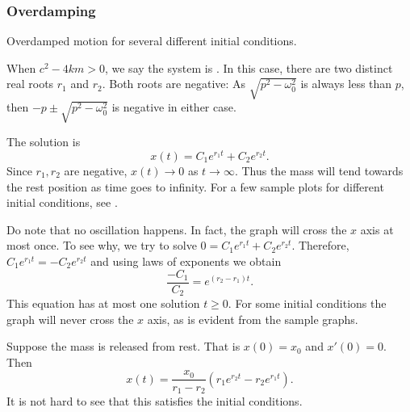 \subsubsection{Overdamping}

\begin{mywrapfig}{3.25in}
\capstart
{}
\caption{Overdamped motion for several different initial conditions.\label{mv:overdampedfig}}
\end{mywrapfig}
%
%

When
$c^2 - 4km > 0$, we say the system is \emph{}.  In this case,
there are two distinct real roots $r_1$ and $r_2$.  Both roots are
negative:  As $\sqrt{p^2 - \omega_0^2}$ is always less than $p$,
then
$-p \pm \sqrt{p^2 - \omega_0^2}$ is negative in either case.


The solution is
\begin{equation*}
x(t) = C_1 e^{r_1 t} + C_2 e^{r_2 t} .
\end{equation*}
Since $r_1, r_2$ are negative, $x(t) \to 0$ as $t \to \infty$.
Thus the mass will tend towards the rest position as
time goes to infinity.  For a few sample plots for different initial
conditions, see .


Do note that no oscillation happens.  In fact, the graph will cross the $x$
axis at most once.  To see why, we try to solve
$0 = C_1 e^{r_1 t} + C_2 e^{r_2 t}$.
Therefore, $C_1 e^{r_1 t} = - C_2 e^{r_2 t}$ and using laws of exponents we
obtain
\begin{equation*}
\frac{-C_1}{C_2} = e^{(r_2-r_1) t} .
\end{equation*}
This equation has at most one solution $t \geq 0$.
For some initial conditions the graph will never cross the $x$ axis, as is
evident from the sample graphs.

\begin{example}
Suppose the mass is released from rest.  That is
$x(0) = x_0$ and $x'(0) = 0$.
Then
\begin{equation*}
x(t) = \frac{x_0}{r_1-r_2} \left(r_1 e^{r_2 t} - r_2 e^{r_1 t} \right) .
\end{equation*}
It is not hard to see that this satisfies the initial conditions.
\end{example}

